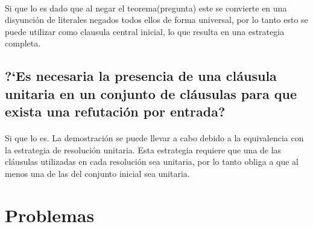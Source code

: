 \documentclass[10pt, a4paper,spanish]{article}
\begin{document}
			\paragraph{}
			Si que lo es dado que al negar el teorema(pregunta) este se convierte en una disyunción de literales negados todos ellos de forma universal, por lo tanto esto se puede utilizar como clausula central inicial, lo que resulta en una estrategia completa.


		\subsection{?`Es necesaria la presencia de una cláusula unitaria en un conjunto de cláusulas para que exista una refutación por entrada?}

			\paragraph{}
			Si que lo es. La demostración se puede llevar a cabo debido a la equivalencia con la estrategia de resolución unitaria. Esta estrategia requiere que una de las cláusulas utilizadas en cada resolución sea unitaria, por lo tanto obliga a que al menos una de las del conjunto inicial sea unitaria.


	\section{Problemas}
\end{document}
